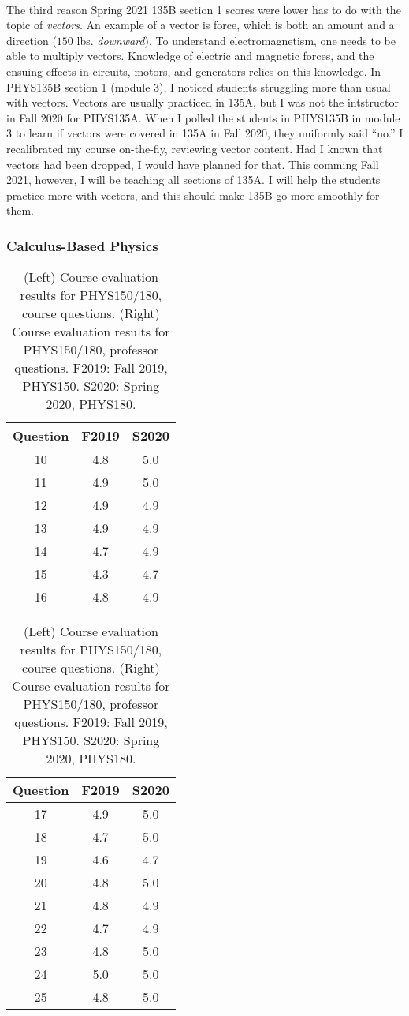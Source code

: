 \documentclass[../../main.tex]{subfiles}
\begin{document}
\\
\vspace{0.25cm}
The third reason Spring 2021 135B section 1 scores were lower has to do with the topic of \textit{vectors}.  An example of a vector is force, which is both an amount and a direction ($150$ lbs. \textit{downward}).  To understand electromagnetism, one needs to be able to multiply vectors.  Knowledge of electric and magnetic forces, and the ensuing effects in circuits, motors, and generators relies on this knowledge.  In PHYS135B section 1 (module 3), I noticed students struggling more than usual with vectors.  Vectors are usually practiced in 135A, but I was not the intstructor in Fall 2020 for PHYS135A.  When I polled the students in PHYS135B in module 3 to learn if vectors were covered in 135A in Fall 2020, they uniformly said ``no.''  I recalibrated my course on-the-fly, reviewing vector content.  Had I known that vectors had been dropped, I would have planned for that.  This comming Fall 2021, however, I will be teaching all sections of 135A.  I will help the students practice more with vectors, and this should make 135B go more smoothly for them.

\subsubsection{Calculus-Based Physics}

\begin{table}
\footnotesize
\centering
\begin{tabular}{| c | c | c |}
\hline
\hline
Question & F2019 & S2020 \\ \hline
10 & 4.8 & 5.0 \\ \hline
11 & 4.9 & 5.0 \\ \hline
12 & 4.9 & 4.9 \\ \hline
13 & 4.9 & 4.9 \\ \hline
14 & 4.7 & 4.9 \\ \hline
15 & 4.3 & 4.7 \\ \hline
16 & 4.8 & 4.9 \\ \hline
\hline
\end{tabular}
\begin{tabular}{| c | c | c |}
\hline
\hline
Question & F2019 & S2020 \\ \hline
17 & 4.9 & 5.0 \\ \hline
18 & 4.7 & 5.0 \\ \hline
19 & 4.6 & 4.7 \\ \hline
20 & 4.8 & 5.0 \\ \hline
21 & 4.8 & 4.9 \\ \hline
22 & 4.7 & 4.9 \\ \hline
23 & 4.8 & 5.0 \\ \hline
24 & 5.0 & 5.0 \\ \hline
25 & 4.8 & 5.0 \\ \hline
\hline
\end{tabular}
\caption{\label{tab:eval_150_180} (Left) Course evaluation results for PHYS150/180, course questions.  (Right) Course evaluation results for PHYS150/180, professor questions.  F2019: Fall 2019, PHYS150.  S2020: Spring 2020, PHYS180.}
\end{table}
\end{document}
